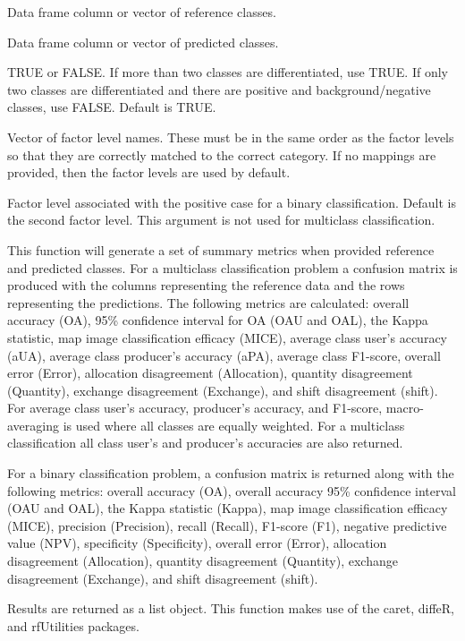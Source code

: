 \documentclass[a4paper]{book}
\begin{document}
%
\begin{Arguments}
\begin{ldescription}
\item[\code{reference}] Data frame column or vector of reference classes.

\item[\code{predicted}] Data frame column or vector of predicted classes.

\item[\code{multiclass}] TRUE or FALSE. If more than two classes are differentiated,
use TRUE. If only two classes are differentiated and there are positive and
background/negative classes, use FALSE. Default is TRUE.

\item[\code{mappings}] Vector of factor level names. These must be in the same order
as the factor levels so that they are correctly matched to the correct category.
If no mappings are provided, then the factor levels are used by default.

\item[\code{positive\_case}] Factor level associated with the positive case for a
binary classification. Default is the second factor level. This argument is
not used for multiclass classification.
\end{ldescription}
\end{Arguments}
%
\begin{Details}\relax
This function will generate a set of summary metrics when provided
reference and predicted classes. For a multiclass classification problem
a confusion matrix is produced with the columns representing the reference
data and the rows representing the predictions. The following metrics are
calculated: overall accuracy (OA), 95\% confidence interval for OA
(OAU and OAL), the Kappa statistic, map image classification
efficacy (MICE), average class user's accuracy (aUA), average class
producer's accuracy (aPA), average class F1-score, overall error (Error),
allocation disagreement (Allocation), quantity disagreement (Quantity),
exchange disagreement (Exchange), and shift disagreement (shift). For average
class user's accuracy, producer's accuracy, and F1-score, macro-averaging
is used where all classes are equally weighted. For a multiclass classification
all class user's and producer's accuracies are also returned.

For a binary classification problem, a confusion matrix is returned
along with the following metrics: overall accuracy (OA), overall accuracy
95\% confidence interval (OAU and OAL), the Kappa statistic (Kappa), map
image classification efficacy (MICE), precision (Precision), recall (Recall),
F1-score (F1), negative predictive value (NPV), specificity (Specificity),
overall error (Error), allocation disagreement (Allocation), quantity
disagreement (Quantity), exchange disagreement (Exchange), and shift
disagreement (shift).

Results are returned as a list object. This function makes use of the caret,
diffeR, and rfUtilities packages.
\end{Details}
\end{document}
